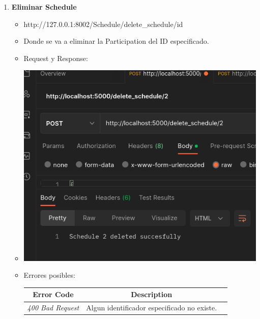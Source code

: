 \documentclass{article}
\begin{document}
\begin{enumerate}
    \item \textbf{Eliminar Schedule}
    \begin{itemize}
        \item http://127.0.0.1:8002/Schedule/delete\_schedule/id
        \item Donde se va a eliminar la Participation del ID especificado.
        \item Request y Response:
        \item \includegraphics[scale=.5]{assets/schedule/delete.png}
        \item Errores posibles: \begin{table}[H] \centering
        \begin{tabular}{|c|c|l|} \hline \textbf{Error Code} &
        \textbf{Description} \\ \hline \textit{400 Bad Request} & Algun
        identificador especificado no existe. \\ \hline \end{tabular}
        \end{table}
    \end{itemize}
\end{enumerate}


\end{document}
